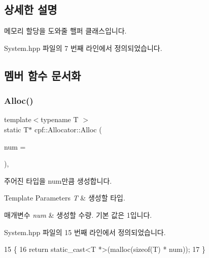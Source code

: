 \subsection{상세한 설명}
메모리 할당을 도와줄 핼퍼 클래스입니다. 

System.\+hpp 파일의 7 번째 라인에서 정의되었습니다.



\subsection{멤버 함수 문서화}
\mbox{\label{classcpf_1_1_allocator_a3481cae5807aa57faf8ac9157bd5c618}} 
\subsubsection{\texorpdfstring{Alloc()}{Alloc()}}
{\footnotesize\ttfamily template$<$typename T $>$ \\
static T$\ast$ cpf\+::\+Allocator\+::\+Alloc (\begin{DoxyParamCaption}\item[{uint32\+\_\+t}]{num = {} }\end{DoxyParamCaption})\hspace{0.3cm}{\ttfamily [inline]}, {\ttfamily [static]}}

주어진 타입을 num만큼 생성합니다. 
\begin{DoxyTemplParams}{Template Parameters}
{\em T} & 생성할 타입. \\
\hline
\end{DoxyTemplParams}

\begin{DoxyParams}{매개변수}
{\em num} & 생성할 수량. 기본 값은 1입니다. \\
\hline
\end{DoxyParams}


System.\+hpp 파일의 15 번째 라인에서 정의되었습니다.


\begin{DoxyCode}
15                                           \{
16             \textcolor{keywordflow}{return} \textcolor{keyword}{static\_cast<}T *\textcolor{keyword}{>}(malloc(\textcolor{keyword}{sizeof}(T) * num));
17         \}
\end{DoxyCode}
\mbox{\label{classcpf_1_1_allocator_a6c7808c532c47dc997deaf296aae4f27}} 
